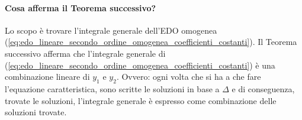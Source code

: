 
\paragraph{Cosa afferma il Teorema successivo?} Lo scopo è trovare l'integrale generale dell'EDO omogenea (\ref{eq:edo_lineare_secondo_ordine_omogenea_coefficienti_costanti}). Il Teorema successivo afferma che l'integrale generale di (\ref{eq:edo_lineare_secondo_ordine_omogenea_coefficienti_costanti}) è una combinazione lineare di $y_1$ e $y_2$. Ovvero: ogni volta che si ha a che fare l'equazione caratteristica, sono scritte le soluzioni in base a $\Delta$ e di conseguenza, trovate le soluzioni, l'integrale generale è espresso come combinazione delle soluzioni trovate. 

